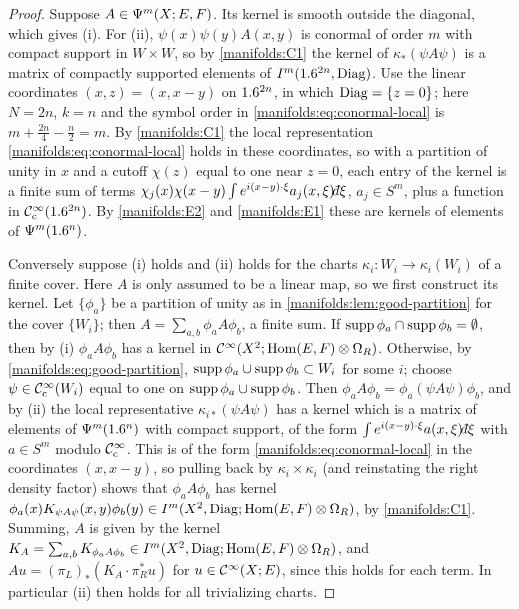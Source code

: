 \begin{proof}
Suppose $A\in\Psi^{m}(X;E,F)$. Its kernel is smooth outside the diagonal, which
gives (i). For (ii), $\psi(x)\psi(y)A(x,y)$ is conormal of order $m$ with compact
support in $W\times W$, so by \ref{manifolds:C1} the kernel of $\kappa_*(\psi A\psi)$
is a matrix of compactly supported elements of $I^{m}(1.6^{2n},\operatorname{Diag})$. Use the
linear coordinates $(x,z)=(x,x-y)$ on $1.6^{2n}$, in which $\operatorname{Diag}=\{z=0\}$; here
$N=2n$, $k=n$ and the symbol order in \eqref{manifolds:eq:conormal-local} is
$m+\frac{2n}4-\frac n2=m$. By \ref{manifolds:C1} the local representation
\eqref{manifolds:eq:conormal-local} holds in these coordinates, so with a partition
of unity in $x$ and a cutoff $\chi(z)$ equal to one near $z=0$, each entry of the
kernel is a finite sum of terms
$\chi_j(x)\chi(x-y)\int e^{i(x-y)\cdot\xi}a_j(x,\xi)\dbar\xi$, $a_j\in S^m$, plus a
function in $\mathcal{C}^\infty_{\mathrm{c}}(1.6^{2n})$. By \ref{manifolds:E2} and \ref{manifolds:E1} these
are kernels of elements of $\Psi^{m}(1.6^n)$.

Conversely suppose (i) holds and (ii) holds for the charts $\kappa_i:W_i\to\kappa_i(W_i)$ of
a finite cover. Here $A$ is only assumed to be a linear map, so we first construct its
kernel. Let $\{\phi_a\}$ be a partition of unity as in \cref{manifolds:lem:good-partition}
for the cover $\{W_i\}$; then $A=\sum_{a,b}\phi_aA\phi_b$, a finite sum. If
$\operatorname{supp}\phi_a\cap\operatorname{supp}\phi_b=\emptyset$, then by (i) $\phi_aA\phi_b$ has a kernel in
$\mathcal{C}^\infty(X^2;\operatorname{Hom}(E,F)\otimes\Omega_R)$. Otherwise, by \eqref{manifolds:eq:good-partition},
$\operatorname{supp}\phi_a\cup\operatorname{supp}\phi_b\subset W_i$ for some $i$; choose $\psi\in\mathcal{C}^\infty_{\mathrm{c}}(W_i)$ equal to one
on $\operatorname{supp}\phi_a\cup\operatorname{supp}\phi_b$. Then $\phi_aA\phi_b=\phi_a(\psi A\psi)\phi_b$, and by (ii)
the local representative $\kappa_{i*}(\psi A\psi)$ has a kernel which is a matrix of elements
of $\Psi^{m}(1.6^n)$ with compact support, of the form $\int e^{i(x-y)\cdot\xi}a(x,\xi)\dbar\xi$
with $a\in S^m$ modulo $\mathcal{C}^\infty_{\mathrm{c}}$. This is of the form \eqref{manifolds:eq:conormal-local} in the
coordinates $(x,x-y)$, so pulling back by $\kappa_i\times\kappa_i$ (and reinstating the right
density factor) shows that $\phi_aA\phi_b$ has kernel
$\phi_a(x)K_{\psi A\psi}(x,y)\phi_b(y)\in I^{m}(X^2,\operatorname{Diag};\operatorname{Hom}(E,F)\otimes\Omega_R)$, by
\ref{manifolds:C1}. Summing, $A$ is given by the kernel
$K_A=\sum_{a,b}K_{\phi_aA\phi_b}\in I^{m}(X^2,\operatorname{Diag};\operatorname{Hom}(E,F)\otimes\Omega_R)$, and
$Au=(\pi_L)_*(K_A\cdot\pi_R^*u)$ for $u\in\mathcal{C}^\infty(X;E)$, since this holds for each term.
In particular (ii) then holds for all trivializing charts.
\end{proof}

